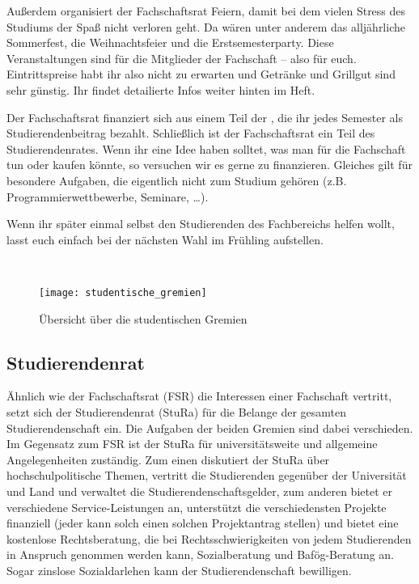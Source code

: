Außerdem organisiert der Fachschaftsrat Feiern, damit bei dem vielen Stress des Studiums der Spaß nicht verloren geht.
Da wären unter anderem das alljährliche Sommerfest, die Weihnachtsfeier und die Erstsemesterparty.
Diese Veranstaltungen sind für die Mitglieder der Fachschaft -- also für euch.
Eintrittspreise habt ihr also nicht zu erwarten und Getränke und Grillgut sind sehr günstig.
Ihr findet detailierte Infos weiter hinten im Heft.

Der Fachschaftsrat finanziert sich aus einem Teil der , die ihr jedes Semester als Studierendenbeitrag bezahlt.
Schließlich ist der Fachschaftsrat ein Teil des Studierendenrates.
Wenn ihr eine Idee haben solltet, was man für die Fachschaft tun oder kaufen könnte, so versuchen wir es gerne zu finanzieren.
Gleiches gilt für besondere Aufgaben, die eigentlich nicht zum Studium gehören (\;z.B. Programmierwettbewerbe, Seminare, \ldots).

Wenn ihr später einmal selbst den Studierenden des Fachbereichs helfen wollt, lasst euch einfach bei der nächsten Wahl im Frühling aufstellen.

\\

\begin{figure}[htb]
    \centering
    \texttt{[image: studentische\_gremien]}\\
    \caption{Übersicht über die studentischen Gremien}
    \label{fig:gremien}
\end{figure}

\subsection{Studierendenrat}

Ähnlich wie der Fachschaftsrat (FSR) die Interessen einer Fachschaft vertritt, setzt sich der Studierendenrat (StuRa) für die Belange der gesamten Studierendenschaft ein.
Die Aufgaben der beiden Gremien sind dabei verschieden.
Im Gegensatz zum FSR ist der StuRa für universitätsweite und allgemeine Angelegenheiten zuständig.
Zum einen diskutiert der StuRa über hochschulpolitische Themen,  vertritt die Studierenden gegenüber der Universität und Land und verwaltet die Studierendenschaftsgelder, zum anderen bietet er verschiedene Service-Leistungen an, unterstützt die verschiedensten Projekte finanziell (jeder kann solch einen solchen Projektantrag stellen) und bietet eine kostenlose Rechtsberatung, die bei Rechtsschwierigkeiten von jedem Studierenden in Anspruch genommen werden kann, Sozialberatung und Bafög-Beratung an.
Sogar zinslose Sozialdarlehen kann der Studierendenschaft bewilligen.

